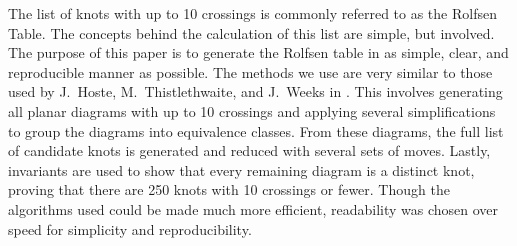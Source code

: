 
\code
\diagrams
\theorems

\begin{paperabs}
The list of knots with up to 10 crossings is commonly referred to as the Rolfsen
Table.
The concepts behind the calculation of this list are simple, but involved.
The purpose of this paper is to generate the Rolfsen table in as simple, clear,
and reproducible manner as possible.
The methods we use are very similar to those used by J.~Hoste,
M.~Thistlethwaite, and J.~Weeks in \cite{htw}.
This involves generating all planar diagrams with up to 10 crossings and
applying several simplifications to group the diagrams into equivalence classes.
From these diagrams, the full list of candidate knots is generated and reduced
with several sets of moves.
Lastly, invariants are used to show that every remaining diagram is a distinct
knot, proving that there are 250 knots with 10 crossings or fewer.
Though the algorithms used could be made much more efficient, readability was
chosen over speed for simplicity and reproducibility.
\end{paperabs}
